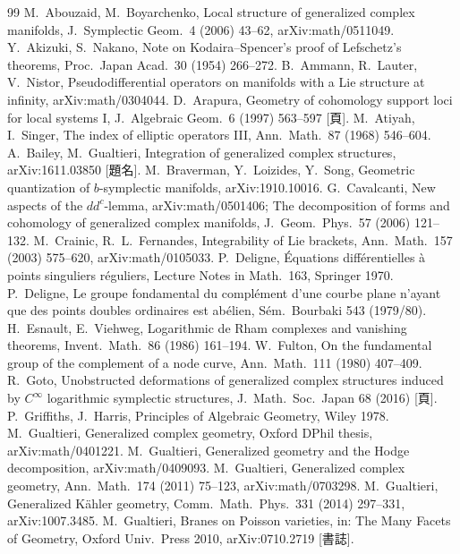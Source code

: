 \begin{thebibliography}{99}\small
{} M.\ Abouzaid, M.\ Boyarchenko, Local structure of generalized complex manifolds, J.\ Symplectic Geom.\ 4 (2006) 43--62, arXiv:math/0511049.
 Y.\ Akizuki, S.\ Nakano, Note on Kodaira--Spencer's proof of Lefschetz's theorems, Proc.\ Japan Acad.\ 30 (1954) 266--272.
 B.\ Ammann, R.\ Lauter, V.\ Nistor, Pseudodifferential operators on manifolds with a Lie structure at infinity, arXiv:math/0304044.
 D.\ Arapura, Geometry of cohomology support loci for local systems I, J.\ Algebraic Geom.\ 6 (1997) 563--597 [頁\tQ].
 M.\ Atiyah, I.\ Singer, The index of elliptic operators III, Ann.\ Math.\ 87 (1968) 546--604.
 A.\ Bailey, M.\ Gualtieri, Integration of generalized complex structures, arXiv:1611.03850 [題名\tQ].
 M.\ Braverman, Y.\ Loizides, Y.\ Song, Geometric quantization of $b$-symplectic manifolds, arXiv:1910.10016.
 G.\ Cavalcanti, New aspects of the $dd^c$-lemma, arXiv:math/0501406; The decomposition of forms and cohomology of generalized complex manifolds, J.\ Geom.\ Phys.\ 57 (2006) 121--132.
 M.\ Crainic, R.\ L.\ Fernandes, Integrability of Lie brackets, Ann.\ Math.\ 157 (2003) 575--620, arXiv:math/0105033.
 P.\ Deligne, \'Equations diff\'erentielles \`a points singuliers r\'eguliers, Lecture Notes in Math.\ 163, Springer 1970.
 P.\ Deligne, Le groupe fondamental du compl\'ement d'une courbe plane n'ayant que des points doubles ordinaires est ab\'elien, S\'em.\ Bourbaki 543 (1979/80).
 H.\ Esnault, E.\ Viehweg, Logarithmic de Rham complexes and vanishing theorems, Invent.\ Math.\ 86 (1986) 161--194.
 W.\ Fulton, On the fundamental group of the complement of a node curve, Ann.\ Math.\ 111 (1980) 407--409.
 R.\ Goto, Unobstructed deformations of generalized complex structures induced by $C^\infty$ logarithmic symplectic structures, J.\ Math.\ Soc.\ Japan 68 (2016) [頁\tQ].
 P.\ Griffiths, J.\ Harris, Principles of Algebraic Geometry, Wiley 1978.
 M.\ Gualtieri, Generalized complex geometry, Oxford DPhil thesis, arXiv:math/0401221.
 M.\ Gualtieri, Generalized geometry and the Hodge decomposition, arXiv:math/0409093.
 M.\ Gualtieri, Generalized complex geometry, Ann.\ Math.\ 174 (2011) 75--123, arXiv:math/0703298.
 M.\ Gualtieri, Generalized K\"ahler geometry, Comm.\ Math.\ Phys.\ 331 (2014) 297--331, arXiv:1007.3485.
 M.\ Gualtieri, Branes on Poisson varieties, in: The Many Facets of Geometry, Oxford Univ.\ Press 2010, arXiv:0710.2719 [書誌\tQ].

\end{thebibliography}
